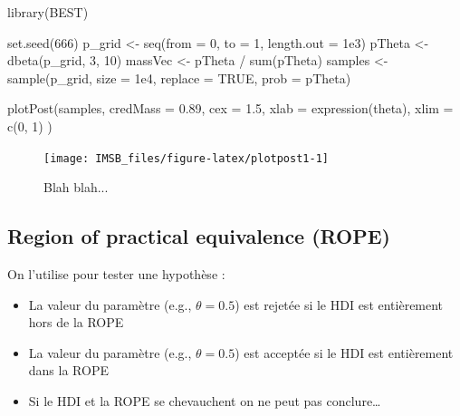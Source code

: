 \documentclass[
  a4paper,11pt,twoside,onecolumn,openright,final,oldfontcommands]{memoir}
\newenvironment{Shaded}{\begin{snugshade}}{\end{snugshade}}
\newcommand{\AttributeTok}[1]{\textcolor[rgb]{0.77,0.63,0.00}{#1}}
\newcommand{\ConstantTok}[1]{\textcolor[rgb]{0.00,0.00,0.00}{#1}}
\newcommand{\DecValTok}[1]{\textcolor[rgb]{0.00,0.00,0.81}{#1}}
\newcommand{\FloatTok}[1]{\textcolor[rgb]{0.00,0.00,0.81}{#1}}
\newcommand{\FunctionTok}[1]{\textcolor[rgb]{0.00,0.00,0.00}{#1}}
\newcommand{\NormalTok}[1]{#1}
\newcommand{\OtherTok}[1]{\textcolor[rgb]{0.56,0.35,0.01}{#1}}
\newcommand{\SpecialCharTok}[1]{\textcolor[rgb]{0.00,0.00,0.00}{#1}}
\providecommand{\tightlist}{%
  \setlength{\itemsep}{0pt}\setlength{\parskip}{0pt}}
\theoremstyle{definition}
\theoremstyle{definition}
\theoremstyle{definition}
\theoremstyle{definition}
\theoremstyle{remark}
\begin{document}
\begin{Shaded}
\begin{Highlighting}[]
\FunctionTok{library}\NormalTok{(BEST)}

\FunctionTok{set.seed}\NormalTok{(}\DecValTok{666}\NormalTok{)}
\NormalTok{p\_grid }\OtherTok{\textless{}{-}} \FunctionTok{seq}\NormalTok{(}\AttributeTok{from =} \DecValTok{0}\NormalTok{, }\AttributeTok{to =} \DecValTok{1}\NormalTok{, }\AttributeTok{length.out =} \FloatTok{1e3}\NormalTok{)}
\NormalTok{pTheta }\OtherTok{\textless{}{-}} \FunctionTok{dbeta}\NormalTok{(p\_grid, }\DecValTok{3}\NormalTok{, }\DecValTok{10}\NormalTok{)}
\NormalTok{massVec }\OtherTok{\textless{}{-}}\NormalTok{ pTheta }\SpecialCharTok{/} \FunctionTok{sum}\NormalTok{(pTheta)}
\NormalTok{samples }\OtherTok{\textless{}{-}} \FunctionTok{sample}\NormalTok{(p\_grid, }\AttributeTok{size =} \FloatTok{1e4}\NormalTok{, }\AttributeTok{replace =} \ConstantTok{TRUE}\NormalTok{, }\AttributeTok{prob =}\NormalTok{ pTheta)}

\FunctionTok{plotPost}\NormalTok{(samples, }\AttributeTok{credMass =} \FloatTok{0.89}\NormalTok{, }\AttributeTok{cex =} \FloatTok{1.5}\NormalTok{, }\AttributeTok{xlab =} \FunctionTok{expression}\NormalTok{(theta), }\AttributeTok{xlim =} \FunctionTok{c}\NormalTok{(}\DecValTok{0}\NormalTok{, }\DecValTok{1}\NormalTok{) )}
\end{Highlighting}
\end{Shaded}

\begin{figure}[!htb]

{\centering \texttt{[image: IMSB\_files/figure-latex/plotpost1-1]} 

}

\caption{Blah blah...}\label{fig:plotpost1}
\end{figure}

\hypertarget{region-of-practical-equivalence-rope}{%
\subsection{Region of practical equivalence (ROPE)}\label{region-of-practical-equivalence-rope}}

On l'utilise pour tester une hypothèse :

\begin{itemize}
\tightlist
\item
  La valeur du paramètre (e.g., \(\theta = 0.5\)) est rejetée si le HDI est entièrement hors de la ROPE
\item
  La valeur du paramètre (e.g., \(\theta = 0.5\)) est acceptée si le HDI est entièrement dans la ROPE
\item
  Si le HDI et la ROPE se chevauchent on ne peut pas conclure\ldots{}
\end{itemize}
\end{document}
